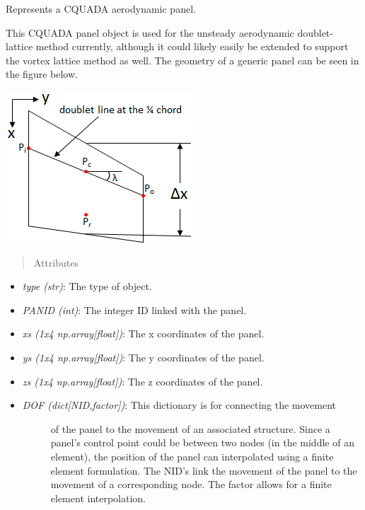 \documentclass[letterpaper,10pt,english]{sphinxmanual}
\begin{document}
\begin{fulllineitems}
\label{aerodynamics:AeroComBAT.Aerodynamics.CQUADA}
Represents a CQUADA aerodynamic panel.

This CQUADA panel object is used for the unsteady aerodynamic doublet-
lattice method currently, although it could likely easily be extended to
support the vortex lattice method as well. The geometry of a generic panel
can be seen in the figure below.

{\hfill\includegraphics{DoubletLatticePanel.png}\hfill}
\begin{quote}\begin{description}
\item[{Attributes}] \leavevmode
\end{description}\end{quote}
\begin{itemize}
\item {} 
\emph{type (str)}: The type of object.

\item {} 
\emph{PANID (int)}: The integer ID linked with the panel.

\item {} 
\emph{xs (1x4 np.array{[}float{]})}: The x coordinates of the panel.

\item {} 
\emph{ys (1x4 np.array{[}float{]})}: The y coordinates of the panel.

\item {} 
\emph{zs (1x4 np.array{[}float{]})}: The z coordinates of the panel.

\item {} \begin{description}
\item[{\emph{DOF (dict{[}NID,factor{]})}: This dictionary is for connecting the movement}] \leavevmode
of the panel to the movement of an associated structure. Since a
panel's control point could be between two nodes (in the middle of an
element), the position of the panel can interpolated using a finite
element formulation. The NID's link the movement of the panel to the
movement of a corresponding node. The factor allows for a finite
element interpolation.


\end{description}
\end{itemize}
\end{fulllineitems}
\end{document}
